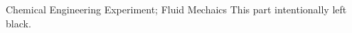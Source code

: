 \makecover

\begin{abstract}{化工原理实验; 流体力学}
这一部分有意留白。
\end{abstract}


\begin{abstractEng}{Chemical Engineering Experiment; Fluid Mechaics}
This part intentionally left black.
\end{abstractEng}


\tableofcontents